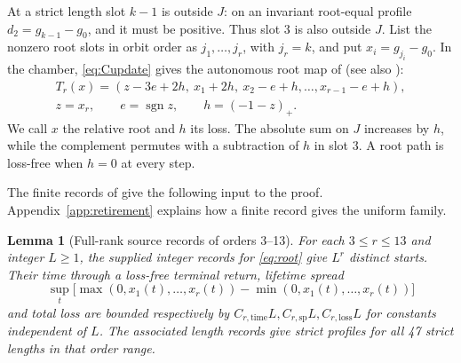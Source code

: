 \documentclass[11pt]{amsart}
\newtheorem{lemma}[theorem]{Lemma}
\theoremstyle{definition}
\DeclareMathOperator{\sgn}{sgn}
\begin{document}
At a strict length slot \(k-1\) is outside \(J\):
on an invariant root-equal profile \(d_2=g_{k-1}-g_0\),
and it must be positive. Thus slot 3 is also outside \(J\).
List the nonzero root slots in orbit order as \(j_1,\ldots,j_r\),
with \(j_r=k\), and put \(x_i=g_{j_i}-g_0\).
In the chamber, \eqref{eq:Cupdate} gives the autonomous root map of
\cite[Section~2.2]{G9} (see also \cite[Section~5]{G10}):
\begin{equation}\label{eq:root}
 \begin{gathered}
 T_r(x)=(z-3e+2h,\ x_1+2h,\ x_2-e+h,\ldots,x_{r-1}-e+h),\\
 z=x_r,\qquad e=\sgn z,\qquad h=(-1-z)_+ .
 \end{gathered}
\end{equation}
We call \(x\) the relative root and \(h\) its loss. The absolute
sum on \(J\) increases by \(h\), while the complement permutes with
a subtraction of \(h\) in slot 3. A root path is loss-free
when \(h=0\) at every step.

The finite records of \cite[Appendix~B]{G9} give the following
input to the proof. Appendix~\ref{app:retirement} explains how
a finite record gives the uniform family.
\begin{lemma}[Full-rank source records of orders 3--13]\label{lem:p9}
For each \(3\le r\le13\) and integer \(L\ge1\), the supplied
integer records for \eqref{eq:root} give \(L^r\) distinct starts.
Their time through a loss-free terminal return, lifetime spread
\[
 \sup_t\bigl[\max(0,x_1(t),\ldots,x_r(t))-\min(0,x_1(t),\ldots,x_r(t))\bigr]
\]
and total loss are bounded respectively
by \(C_{r,\mathrm{time}}L,C_{r,\mathrm{sp}}L,C_{r,\mathrm{loss}}L\)
for constants independent of \(L\).
The associated length records give strict profiles for all 47
strict lengths in that order range.
\end{lemma}
\end{document}
